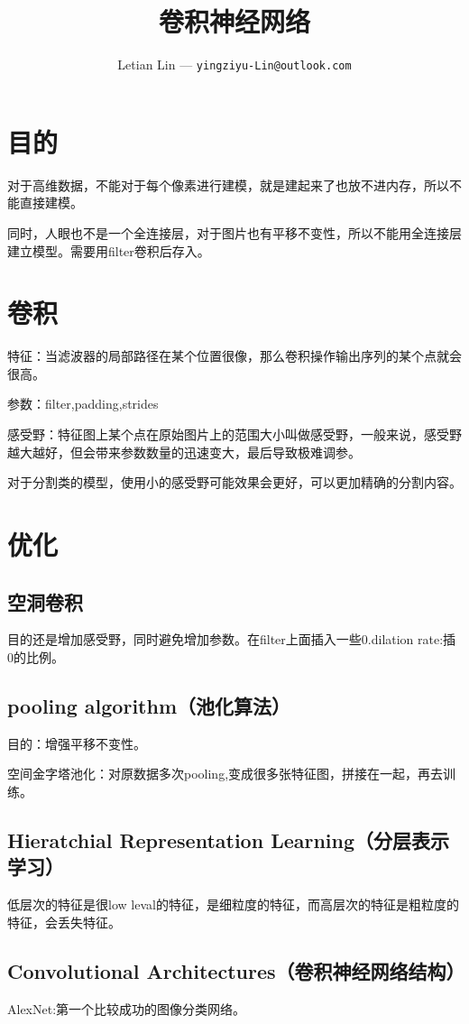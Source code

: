 \documentclass[UTF8]{ctexart}
\title{
	卷积神经网络
}
\author{
	Letian Lin --- \texttt{yingziyu-Lin@outlook.com}
}
\begin{document}
\maketitle
\section{目的}
对于高维数据，不能对于每个像素进行建模，就是建起来了也放不进内存，所以不能直接建模。

同时，人眼也不是一个全连接层，对于图片也有平移不变性，所以不能用全连接层建立模型。需要用filter卷积后存入。

\section{卷积}
特征：当滤波器的局部路径在某个位置很像，那么卷积操作输出序列的某个点就会很高。

参数：filter,padding,strides

感受野：特征图上某个点在原始图片上的范围大小叫做感受野，一般来说，感受野越大越好，但会带来参数数量的迅速变大，最后导致极难调参。

对于分割类的模型，使用小的感受野可能效果会更好，可以更加精确的分割内容。

\section{优化}
\subsection{空洞卷积}
目的还是增加感受野，同时避免增加参数。在filter上面插入一些0.dilation rate:插0的比例。

\subsection{pooling algorithm（池化算法）}
目的：增强平移不变性。

空间金字塔池化：对原数据多次pooling,变成很多张特征图，拼接在一起，再去训练。

\subsection{Hieratchial Representation Learning（分层表示学习）}
低层次的特征是很low leval的特征，是细粒度的特征，而高层次的特征是粗粒度的特征，会丢失特征。

\subsection{Convolutional Architectures（卷积神经⽹络结构）}
AlexNet:第一个比较成功的图像分类网络。
\end{document}
